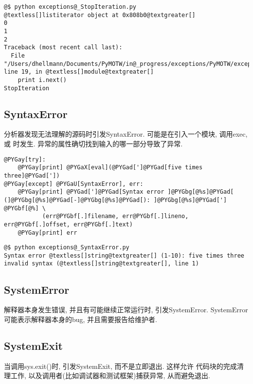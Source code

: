 \documentclass[a4paper,10pt,english]{manual}
\begin{document}
\begin{Verbatim}[commandchars=@\[\]]
@$ python exceptions@_StopIteration.py
@textless[]listiterator object at 0x808b0@textgreater[]
0
1
2
Traceback (most recent call last):
  File "/Users/dhellmann/Documents/PyMOTW/in@_progress/exceptions/PyMOTW/exceptions/exceptions@_StopIteration.py", line 19, in @textless[]module@textgreater[]
    print i.next()
StopIteration
\end{Verbatim}


\subsection{SyntaxError}

分析器发现无法理解的源码时引发SyntaxError. 可能是在引入一个模块, 调用exec, 或  时发生. 异常的属性确切找到输入的哪一部分导致了异常.

\begin{Verbatim}[commandchars=@\[\]]
@PYGay[try]:
    @PYGay[print] @PYGaX[eval](@PYGad[']@PYGad[five times three]@PYGad['])
@PYGay[except] @PYGaU[SyntaxError], err:
    @PYGay[print] @PYGad[']@PYGad[Syntax error ]@PYGbg[@%s]@PYGad[ (]@PYGbg[@%s]@PYGad[-]@PYGbg[@%s]@PYGad[): ]@PYGbg[@%s]@PYGad['] @PYGbf[@%] \
           (err@PYGbf[.]filename, err@PYGbf[.]lineno, err@PYGbf[.]offset, err@PYGbf[.]text)
    @PYGay[print] err
\end{Verbatim}

\begin{Verbatim}[commandchars=@\[\]]
@$ python exceptions@_SyntaxError.py
Syntax error @textless[]string@textgreater[] (1-10): five times three
invalid syntax (@textless[]string@textgreater[], line 1)
\end{Verbatim}


\subsection{SystemError}

解释器本身发生错误, 并且有可能继续正常运行时, 引发SystemError. SystemError可能表示解释器本身的bug, 并且需要报告给维护者.


\subsection{SystemExit}

当调用sys.exit()时, 引发SystemExit, 而不是立即退出. 这样允许  代码块的完成清理工作, 以及调用者(比如调试器和测试框架)捕获异常, 从而避免退出.
\end{document}
